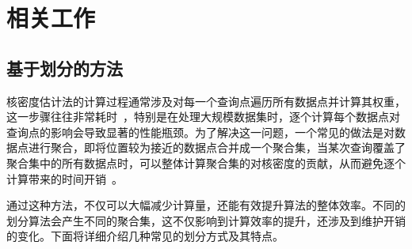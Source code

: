 \chapter{相关工作}

\section{基于划分的方法}

核密度估计法的计算过程通常涉及对每一个查询点遍历所有数据点并计算其权重，这一步骤往往非常耗时~\cite{gramacki_nonparametric_2018}，特别是在处理大规模数据集时，逐个计算每个数据点对查询点的影响会导致显著的性能瓶颈。为了解决这一问题，一个常见的做法是对数据点进行聚合，即将位置较为接近的数据点合并成一个聚合集，当某次查询覆盖了聚合集中的所有数据点时，可以整体计算聚合集的对核密度的贡献，从而避免逐个计算带来的时间开销~\cite{liu_immens_2013}。

通过这种方法，不仅可以大幅减少计算量，还能有效提升算法的整体效率。不同的划分算法会产生不同的聚合集，这不仅影响到计算效率的提升，还涉及到维护开销的变化。下面将详细介绍几种常见的划分方式及其特点。

